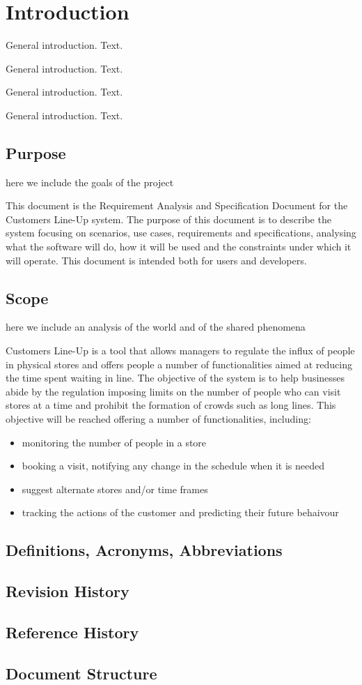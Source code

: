 \section{Introduction}\label{sec:intro}

General introduction. Text.

General introduction. Text.

General introduction. Text.

General introduction. Text.
\subsection{Purpose}
here we include the goals of the project

This document is the Requirement Analysis and Specification Document for the Customers Line-Up system.
The purpose of this document is to describe the system focusing on scenarios, use cases, requirements and specifications,
analysing what the software will do, how it will be used and the constraints under which it will operate.
This document is intended both for users and developers.

\subsection{Scope}
here we include an analysis of the world and of the shared phenomena

Customers Line-Up is a tool that allows managers to regulate the influx of people in physical stores and offers
people a number of functionalities aimed at reducing the time spent waiting in line.
The objective of the system is to help businesses abide by the regulation imposing limits on the number of people
who can visit stores at a time and prohibit the formation of crowds such as long lines.
This objective will be reached offering a number of functionalities, including:
\begin{itemize}
    \item monitoring the number of people in a store
    \item booking a visit, notifying any change in the schedule when it is needed
    \item suggest alternate stores and/or time frames
    \item tracking the actions of the customer and predicting their future behaivour
\end{itemize}

\subsection{Definitions, Acronyms, Abbreviations}
\subsection{Revision History}
\subsection{Reference History}
\subsection{Document Structure}